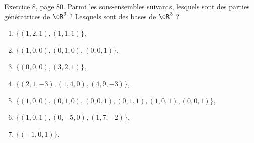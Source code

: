 \begin{exercice}\label{exoLineraire0019}

	Exercice 8, page 80. Parmi les sous-ensembles suivants, lesquels sont des parties génératrices de $\eR^3$ ? Lesquels sont des bases de $\eR^3$ ?
	\begin{enumerate}

		\item
			$\{ (1,2,1),(1,1,1) \}$,
		\item
			$\{ (1,0,0),(0,1,0),(0,0,1) \}$,
		\item
			$\{ (0,0,0),(3,2,1) \}$,
		\item
			$\{ (2,1,-3),(1,4,0),(4,9,-3) \}$,
		\item
			$\{ (1,0,0),(0,1,0),(0,0,1),(0,1,1),(1,0,1),(0,0,1) \}$,
		\item
			$\{ (1,0,1),(0,-5,0),(1,7,-2) \}$,
		\item
			$\{ (-1,0,1) \}$.
	\end{enumerate}

\end{exercice}
